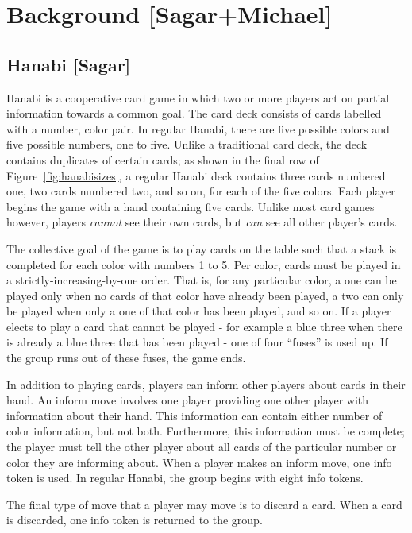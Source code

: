 \section{Background [Sagar+Michael]}
\label{sec:background}

\subsection{Hanabi [Sagar]}
\label{sec:background:hanabi}

Hanabi \cite{hanabiboardgame, hanabiwiki} is a cooperative card game in which
two or more players act on partial information towards a common goal. The
card deck consists of cards labelled with a number, color pair. In regular
Hanabi, there are five possible colors and five possible numbers, one to five.
Unlike a traditional card deck, the deck contains duplicates of certain cards;
as shown in the final row of Figure~\ref{fig:hanabisizes}, a regular Hanabi
deck contains three cards numbered one, two cards numbered two, and so on, for
each of the five colors. Each player begins the game with a hand containing
five cards. Unlike most card games however, players \emph{cannot} see their
own cards, but \emph{can} see all other player's cards.

The collective goal of the game is to play cards on the table such that a stack
is completed for each color with numbers 1 to 5. Per color, cards must be
played in a strictly-increasing-by-one order. That is, for any particular
color, a one can be played only when no cards of that color have already been
played, a two can only be played when only a one of that color has been played,
and so on.  If a player elects to play a card that cannot be played - for
example a blue three when there is already a blue three that has been played
- one of four ``fuses'' is used up. If the group runs out of these fuses, the
game ends.

In addition to playing cards, players can inform other players about cards
in their hand. An inform move involves one player providing one other player
with information about their hand. This information can contain either number
of color information, but not both. Furthermore, this information must be complete;
the player must tell the other player about all cards of the particular number or
color they are informing about. When a player makes an inform move, one info
token is used. In regular Hanabi, the group begins with eight info tokens.

The final type of move that a player may move is to discard a card. When a card
is discarded, one info token is returned to the group.

